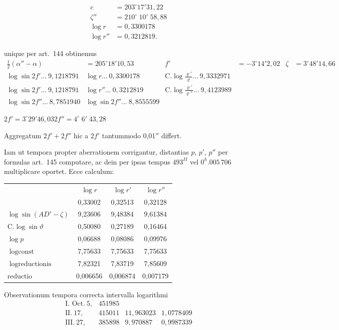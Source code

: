 \documentclass[12pt,a4paper]{article}
\begin{document}
\begin{align*}
c &= 203^\circ17'31,22\\
\zeta'' &= 210^\circ\;10'\;58,88\\
\log r &= 0,3300178\\
\log r'' &= 0,3212819.
\end{align*}

unique per art.~144 obtinemus
\begin{align*}
\tfrac{1}{2}(\alpha'' - \alpha) &= 205^\circ18'10,53 & f' &= -3^\circ14'2,02 & \zeta &= 3^\circ48'14,66\\
\log\sin 2f' \ldots\ 9,1218791 & \log r \ldots\ 0,3300178 & \text{C.}\log\tfrac{\varrho'}{\varrho} \ldots\ 9,3332971\\
\log\sin 2f' \ldots\ 9,1218791 & \log r'' \ldots\ 0,3212819 & \text{C.}\log\tfrac{\varrho'}{\varrho''} \ldots\ 9,4123989\\
\log\sin 2f'' \ldots\ 8,7851940 & \log\sin 2f'' \ldots\ 8,8555599
\end{align*}

$2f' = 3^\circ29'46,03$\quad $2f'' = 4^\circ\;6'\;43,28$

Aggregatum $2f' + 2f''$ hic a $2f'$ tantummodo 0,01$''$ differt.

Iam ut tempora propter aberrationem corrigantur, distantias $p$, $p'$, $p''$ per formulas art.~145 computare, ac dein per ipsas tempus $493^{II}$ vel $0^h.005\,706$ multiplicare oportet. Ecce calculum:

\begin{center}
\begin{tabular}{lccc}
\toprule
& $\log r$ & $\log r'$ & $\log r''$\\
& 0,33002 & 0,32513 & 0,32128\\
$\log\sin(AD' - \zeta)$ & 9,23606 & 9,48384 & 9,61384\\
C.$\log\sin\vartheta$ & 0,50080 & 0,27189 & 0,16464\\
\hline
$\log p$ & 0,06688 & 0,08086 & 0,09976\\
$\log\text{const}$ & 7,75633 & 7,75633 & 7,75633\\
\hline
$\log\text{reductionis}$ & 7,82321 & 7,83719 & 7,85609\\
reductio & 0,006656 & 0,006874 & 0,007179\\
\bottomrule
\end{tabular}
\end{center}

Observationum tempora correcta intervalla logarithmi
\begin{align*}
\text{I. Oct.}\ 5,&451985 & &\\
\text{II.}\ 17,&415011 & 11,963023 & 1,0778409\\
\text{III.}\ 27,&385898 & 9,970887 & 0,9987339
\end{align*}
\end{document}
